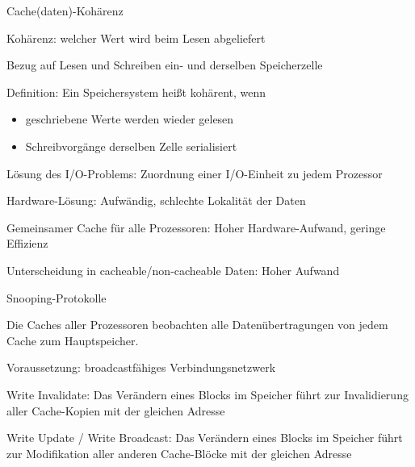 \documentclass[10pt,landscape]{article}
\begin{document}
\begin{multicols}{3}
  
  
  
  
  Cache(daten)-Kohärenz
  \begin{itemize*}
    \item Kohärenz: welcher Wert wird beim Lesen abgeliefert
    \item Bezug auf Lesen und Schreiben ein- und derselben Speicherzelle
    \item Definition: Ein Speichersystem heißt kohärent, wenn
    \begin{itemize}
      \item geschriebene Werte werden wieder gelesen
      \item Schreibvorgänge derselben Zelle serialisiert
    \end{itemize}
    \item Lösung des I/O-Problems: Zuordnung einer I/O-Einheit zu jedem Prozessor
    \item Hardware-Lösung: Aufwändig, schlechte Lokalität der Daten
    \item Gemeinsamer Cache für alle Prozessoren: Hoher Hardware-Aufwand, geringe Effizienz
    \item Unterscheidung in cacheable/non-cacheable Daten: Hoher Aufwand
  \end{itemize*}
  
  Snooping-Protokolle
  \begin{itemize*}
    \item Die Caches aller Prozessoren beobachten alle Datenübertragungen von jedem Cache zum Hauptspeicher.
    \item Voraussetzung: broadcastfähiges Verbindungsnetzwerk
    \item Write Invalidate: Das Verändern eines Blocks im Speicher führt zur Invalidierung aller Cache-Kopien mit der gleichen Adresse
    \item Write Update / Write Broadcast: Das Verändern eines Blocks im Speicher führt zur Modifikation aller anderen Cache-Blöcke mit der gleichen Adresse
  \end{itemize*}
  

\end{multicols}
\end{document}
